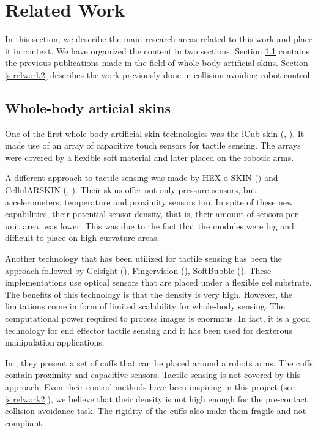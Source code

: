 \chapter{Related Work}
\label{relworkchap}

In this section, we describe the main research areas related to this work and place it in context. We have organized the content in two sections. Section \ref{s:relwork1} contains the previous publications made in the field of whole body artificial skins. Section \ref{s:relwork2} describes the work previously done in collision avoiding robot control.

\section{Whole-body articial skins}
\label{s:relwork1}

One of the first whole-body artificial skin technologies was the iCub skin (\cite{metta2010icub}, \cite{schmitz2011methods}). It made use of an array of capacitive touch sensors for tactile sensing. The arrays were covered by a flexible soft material and later placed on the robotic arms.

A different approach to tactile sensing was made by HEX-o-SKIN (\cite{7793823}) and CellulARSKIN (\cite{5711674}, \cite{mittendorfer2015realizing}). Their skins offer not only pressure sensors, but accelerometers, temperature and proximity sensors too. In spite of these new capabilities, their potential sensor density, that is, their amount of sensors per unit area, was lower. This was due to the fact that the modules were big and difficult to place on high curvature areas.

Another technology that has been utilized for tactile sensing has been the approach followed by Gelsight (\cite{yuan2017gelsight}), Fingervision (\cite{yamaguchi2017implementing}), SoftBubble (\cite{alspach2019soft}). These implementations use optical sensors that are placed under a flexible gel substrate. The benefits of this technology is that the density is very high. However, the limitations come in form of limited scalability for whole-body sensing. The computational power required to process images is enormous. In fact, it is a good technology for end effector tactile sensing and it has been used for dexterous manipulation applications.

In \cite{ding2019proximity}, they present a set of cuffs that can be placed around a robots arms. The cuffs contain proximity and capacitive sensors. Tactile sensing is not covered by this approach. Even their control methods have been inspiring in this project (see \ref{s:relwork2}), we believe that their density is not high enough for the pre-contact collision avoidance task. The rigidity of the cuffs also make them fragile and not compliant.


